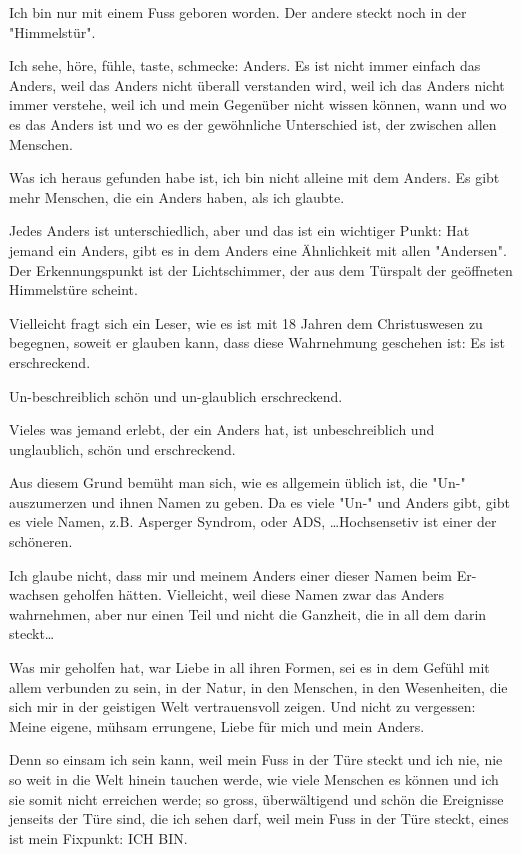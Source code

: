 \documentclass[10pt,titlepage,a5paper]{book}
\begin{document}
 Ich bin nur mit einem Fuss geboren worden. Der andere steckt noch in der "Himmelstür". 
 
 Ich sehe, höre, fühle, taste, schmecke: Anders.
 Es ist nicht immer einfach das Anders, weil das Anders nicht überall verstanden wird, weil ich das Anders nicht immer verstehe, weil ich und mein Gegenüber nicht wissen können, wann und wo es das Anders ist und wo es der gewöhnliche Unterschied ist, der zwischen allen Menschen. 
 
 Was ich heraus gefunden habe ist, ich bin nicht alleine mit dem Anders. Es gibt mehr Menschen, die ein Anders haben, als ich glaubte.
 
 Jedes Anders ist unterschiedlich, aber und das ist ein wichtiger Punkt: Hat jemand ein Anders, gibt es in dem Anders eine Ähnlich\-keit mit allen "{}Andersen". Der Erkennungspunkt ist der Lichtschimmer, der aus dem Türspalt der geöffneten Himmelstüre scheint.
 
 Vielleicht fragt sich ein Leser, wie es ist mit 18 Jahren dem Christuswesen zu begegnen, soweit er glauben kann, dass diese Wahrnehmung geschehen ist: Es ist erschreckend.
 
 Un-beschreiblich schön und un-glaublich erschreckend.
 
 Vieles was jemand erlebt, der ein Anders hat, ist unbeschreiblich und unglaublich, schön und erschreckend.
 
 Aus diesem Grund bemüht man sich, wie es allgemein üblich ist, die "{}Un-"{} auszumerzen und ihnen Namen zu geben. Da es viele "{}Un-"{} und Anders gibt, gibt es viele Namen, z.B. Asperger Syndrom, oder ADS, \dots   Hochsensetiv ist einer der schöneren.
 
 Ich glaube nicht, dass mir und meinem Anders einer dieser Namen beim Er-wachsen geholfen hätten. Vielleicht, weil diese Namen zwar das Anders wahrnehmen, aber nur einen Teil und nicht die Ganzheit, die in all dem darin steckt\dots 
 
 Was mir geholfen hat, war Liebe in all ihren Formen, sei es in dem Gefühl mit allem verbunden zu sein, in der Natur, in den Menschen, in den Wesenheiten, die sich mir in der geistigen Welt vertrauensvoll zeigen. Und nicht zu vergessen: Meine eigene, mühsam errungene, Liebe für mich und mein Anders.
 
 Denn so einsam ich sein kann, weil mein Fuss in der Türe steckt und ich nie, nie so weit in die Welt hinein tauchen werde, wie viele Menschen es können und ich sie somit nicht erreichen werde; so gross, überwältigend und schön die Ereignisse jenseits der Türe sind, die ich sehen darf, weil mein Fuss in der Türe steckt, eines ist mein Fixpunkt: ICH BIN.
 
\end{document}
